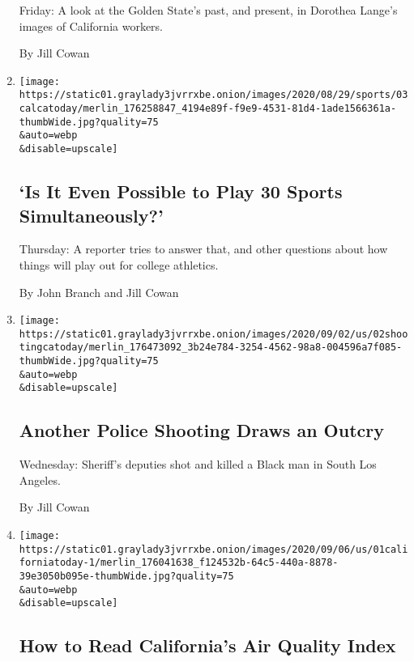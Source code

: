 \begin{enumerate}
  Friday: A look at the Golden State's past, and present, in Dorothea
  Lange's images of California workers.

  By Jill Cowan
\item
  \href{/2020/09/03/us/john-branch-uc-berkeley.html}{}

  \texttt{[image: https://static01.graylady3jvrrxbe.onion/images/2020/08/29/sports/03calcatoday/merlin\_176258847\_4194e89f-f9e9-4531-81d4-1ade1566361a-thumbWide.jpg?quality=75\\\&auto=webp\\\&disable=upscale]}

  \hypertarget{is-it-even-possible-to-play-30-sports-simultaneously}{%
  \subsection{`Is It Even Possible to Play 30 Sports
  Simultaneously?'}\label{is-it-even-possible-to-play-30-sports-simultaneously}}

  Thursday: A reporter tries to answer that, and other questions about
  how things will play out for college athletics.

  By John Branch and Jill Cowan
\item
  \href{/2020/09/02/us/california-eviction-ab-3088.html}{}

  \texttt{[image: https://static01.graylady3jvrrxbe.onion/images/2020/09/02/us/02shootingcatoday/merlin\_176473092\_3b24e784-3254-4562-98a8-004596a7f085-thumbWide.jpg?quality=75\\\&auto=webp\\\&disable=upscale]}

  \hypertarget{another-police-shooting-draws-an-outcry}{%
  \subsection{Another Police Shooting Draws an
  Outcry}\label{another-police-shooting-draws-an-outcry}}

  Wednesday: Sheriff's deputies shot and killed a Black man in South Los
  Angeles.

  By Jill Cowan
\item
  \href{/2020/09/01/us/ca-air-quality-index.html}{}

  \texttt{[image: https://static01.graylady3jvrrxbe.onion/images/2020/09/06/us/01californiatoday-1/merlin\_176041638\_f124532b-64c5-440a-8878-39e3050b095e-thumbWide.jpg?quality=75\\\&auto=webp\\\&disable=upscale]}

  \hypertarget{how-to-read-californias-air-quality-index}{%
  \subsection{How to Read California's Air Quality
  Index}\label{how-to-read-californias-air-quality-index}}


\end{enumerate}
